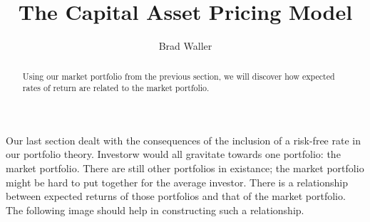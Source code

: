 \documentclass{ximera}
\author{Brad Waller}
\title{The Capital Asset Pricing Model}
\begin{document}
\begin{abstract}
Using our market portfolio from the previous section, we will discover how expected rates of return are related to the market portfolio. 
\end{abstract}

\maketitle

Our last section dealt with the consequences of the inclusion of a risk-free rate in our portfolio theory. Investorw would all gravitate towards one portfolio: the market portfolio. There are still other portfolios in existance; the market portfolio might be hard to put together for the average investor. There is a relationship between expected returns of those portfolios and that of the market portfolio. The following image should help in constructing such a relationship.
\end{document}
